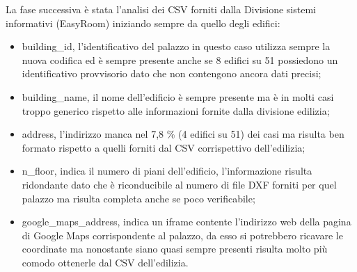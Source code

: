 \documentclass[12pt]{report}
\begin{document}
La fase successiva è stata l'analisi dei CSV forniti dalla Divisione sistemi informativi (EasyRoom) iniziando sempre da quello degli edifici:
\begin{itemize}
\item building\_id, l'identificativo del palazzo in questo caso utilizza sempre la nuova codifica ed è sempre presente anche se 8 edifici su 51 possiedono un identificativo provvisorio dato che non contengono ancora dati precisi;
\item building\_name, il nome dell'edificio è sempre presente ma è in molti casi troppo generico rispetto alle informazioni fornite dalla divisione edilizia;
\item address, l'indirizzo manca nel 7,8 \% (4 edifici su 51) dei casi ma risulta ben formato rispetto a quelli forniti dal CSV corrispettivo dell'edilizia;
\item n\_floor, indica il numero di piani dell'edificio, l'informazione risulta ridondante dato che è riconducibile al numero di file DXF forniti per quel palazzo ma risulta completa anche se poco verificabile;
\item google\_maps\_address, indica un iframe contente l'indirizzo web della pagina di Google Maps corrispondente al palazzo, da esso si potrebbero ricavare le coordinate ma nonostante siano quasi sempre presenti risulta molto più comodo ottenerle dal CSV dell'edilizia. 
\end{itemize} 
\end{document}
